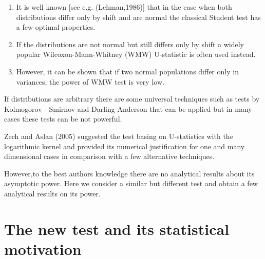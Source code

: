 \documentclass[slidestop,usepdftitle=false]{beamer}
\begin{document}
\begin{slide}

\begin {enumerate}

\item
It is well known [see e.g. (Lehman,1986)] that in the case when both distributions differ only by shift and are normal the classical Student test has a few optimal properties.
\bigskip
\item
If the distributions are not normal but still differs only by shift a widely popular Wilcoxon-Mann-Whitney (WMW) U-statistic is often used instead.
\bigskip

\item
However, it can be shown that if two normal populations differ only in variances, the power of WMW test is very low.
\end{enumerate}
\end{slide}
\begin{slide}
\bigskip

If distributions are arbitrary there are some universal techniques such as tests by Kolmogorov - Smirnov and Darling-Anderson   that can be applied but in many cases these tests can be not powerful.


\bigskip


Zech and Aslan (2005) suggested the test basing on U-statistics with the logarithmic kernel and provided its numerical justification for one and many dimensional cases in comparison with a few alternative techniques.
\bigskip

However,to the best authors knowledge there are no analytical results about its asymptotic power. Here we consider a similar but different test and obtain  a few analytical results on its power.
\end{slide}

\section{The new test and its statistical motivation}
\end{document}
